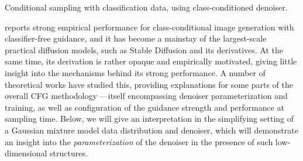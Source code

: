 \documentclass[../../book-main.tex]{subfiles}
\begin{document}
\begin{algorithm}
  \caption{Conditional sampling with classification data, using class-conditioned denoiser.}
	\label{alg:iterative_denoising_conditional_CFG}
	\begin{algorithmic}[1]
		 
		\EndFor
		\EndFunction
	\end{algorithmic}
\end{algorithm}

\textcite{Ho2022-ry} reports strong empirical performance for class-conditional
image generation with classifier-free guidance, and it has become a mainstay of
the largest-scale practical diffusion models, such as Stable Diffusion
\cite{rombach2022high} and its derivatives.
At the same time, its derivation is rather opaque and empirically motivated,
giving little insight into the mechanisms behind its strong performance.
A number of theoretical works have studied this, providing explanations for some
parts of the overall CFG methodology
\cite{Bradley2024-jg,Li2025-li,Wu2024-js}---itself encompassing denoiser
parameterization and training, as well as configuration of the guidance strength
and performance at sampling time.
Below, we will give an interpretation in the simplifying setting
of a Gaussian mixture model data distribution and denoiser, which will
demonstrate an insight into the \textit{parameterization} of the denoiser in the presence of
such low-dimensional structures.
\end{document}
